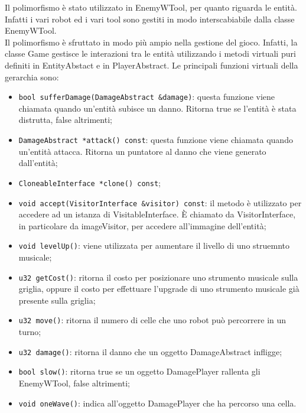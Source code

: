 \documentclass[11pt]{article}
\begin{document}
Il polimorfismo è stato utilizzato in EnemyWTool, per quanto riguarda le entità.
Infatti i vari robot ed i vari tool sono gestiti in modo interscabiabile dalla 
classe EnemyWTool.\\
Il polimorfismo è sfruttato in modo più ampio nella gestione del gioco. Infatti,
la classe Game gestisce le interazioni tra le entità utilizzando i metodi
virtuali puri definiti in EntityAbstact e in PlayerAbstract. 
Le principali funzioni virtuali della gerarchia sono:
\begin{itemize}
	\item \lstinline|bool sufferDamage(DamageAbstract &damage)|: questa funzione 
		viene chiamata quando un'entità subisce un danno. Ritorna true se 
		l'entità è stata distrutta, false altrimenti;

	\item \lstinline|DamageAbstract *attack() const|: questa funzione viene chiamata quando
		un'entità attacca. Ritorna un puntatore al danno che viene generato
		dall'entità;

	\item \lstinline|CloneableInterface *clone() const|;

	\item \lstinline|void accept(VisitorInterface &visitor) const|: il metodo è
		utilizzato per accedere ad un istanza di VisitableInterface. È chiamato
		da VisitorInterface, in particolare da imageVisitor, per accedere
		all'immagine dell'entità;


	\item \lstinline|void levelUp()|: viene utilizzata per aumentare il livello 
		di uno struemnto musicale;

	\item \lstinline|u32 getCost()|: ritorna il costo per posizionare uno strumento musicale
		sulla griglia, oppure il costo per effettuare l'upgrade di uno
		strumento musicale già presente sulla griglia;

	\item \lstinline|u32 move()|: ritorna il numero di celle che uno robot può 
		percorrere in un turno;

	\item \lstinline|u32 damage()|: ritorna il danno che un oggetto 
		DamageAbstract infligge;

	\item \lstinline|bool slow()|: ritorna true se un oggetto DamagePlayer rallenta gli
		EnemyWTool, false altrimenti;

	\item \lstinline|void oneWave()|: indica all'oggetto DamagePlayer che ha percorso una
		cella.
\end{itemize}
\end{document}
